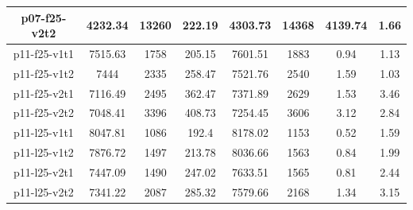 \begin{table}
\begin {tabular}[b]{|c|c|c|c|c|c|c|c|}
p07-f25-v2t2	&	4232.34	&	13260	&	222.19	&	4303.73	&	14368	&	4139.74	&	1.66	\\\hline \hline
p11-f25-v1t1	&	7515.63	&	1758	&	205.15	&	7601.51	&	1883	&	0.94	&	1.13	\\\hline
p11-f25-v1t2	&	7444	&	2335	&	258.47	&	7521.76	&	2540	&	1.59	&	1.03	\\\hline
p11-f25-v2t1	&	7116.49	&	2495	&	362.47	&	7371.89	&	2629	&	1.53	&	3.46	\\\hline
p11-f25-v2t2	&	7048.41	&	3396	&	408.73	&	7254.45	&	3606	&	3.12	&	2.84	\\\hline \hline
p11-l25-v1t1	&	8047.81	&	1086	&	192.4	&	8178.02	&	1153	&	0.52	&	1.59	\\\hline
p11-l25-v1t2	&	7876.72	&	1497	&	213.78	&	8036.66	&	1563	&	0.84	&	1.99	\\\hline
p11-l25-v2t1	&	7447.09	&	1490	&	247.02	&	7633.51	&	1565	&	0.81	&	2.44	\\\hline
p11-l25-v2t2	&	7341.22	&	2087	&	285.32	&	7579.66	&	2168	&	1.34	&	3.15	\\\hline \hline
\end{tabular}
\end{table} 

